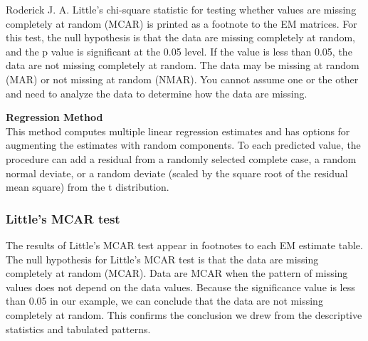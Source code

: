 \documentclass[MASTER.tex]{subfiles}
\begin{document}
 
\begin{frame}
		\Large
Roderick J. A. Little's chi-square statistic for testing whether values are missing completely at random (MCAR) is printed as a footnote to the EM matrices. For this test, the null hypothesis is that the data are missing completely at random, and the p value is significant at the 0.05 level. If the value is less than 0.05, the data are not missing completely at random. The data may be missing at random (MAR) or not missing at random (NMAR). You cannot assume one or the other and need to analyze the data to determine how the data are missing.
	\end{frame}

	\begin{frame}
		\Large
		
\noindent \textbf{Regression Method}\\

This method computes multiple linear regression estimates and has options for augmenting the estimates with random components. To each predicted value, the procedure can add a residual from a randomly selected complete case, a random normal deviate, or a random deviate (scaled by the square root of the residual mean square) from the t distribution.
\end{frame}
\begin{frame}
\frametitle{Little's MCAR test}
		\Large
The results of Little’s MCAR test appear in footnotes to each EM estimate table. The null
hypothesis for Little’s MCAR test is that the data are missing completely at random (MCAR).
Data are MCAR when the pattern of missing values does not depend on the data values. Because
the significance value is less than 0.05 in our example, we can conclude that the data are not
missing completely at random. This confirms the conclusion we drew from the descriptive
statistics and tabulated patterns.
	\end{frame}
\end{document}
